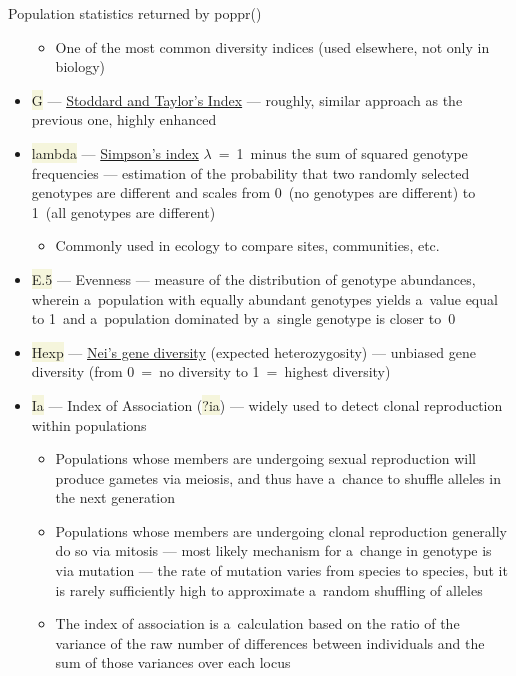 \documentclass[compress, xelatex, 11pt, xcolor=svgnames, aspectratio=169,
	hyperref={
		bookmarks=true,
		unicode=true,
		colorlinks=true,
		pdftitle={Molecular data in R},
		plainpages=false,
		pdfauthor={Vojtech Zeisek},
		pdfsubject={Course about phylogeny and evolution in R},
		pdfcreator={XeLaTeX},
		pdfkeywords={R, evolution, phylogeny, molecular data},
		linkcolor=Crimson, %
		anchorcolor=Magenta, %
		citecolor=Magenta, %
		filecolor=Magenta, %
		menucolor=Magenta, %
		urlcolor=DodgerBlue, %
		},
	url={hyphens, lowtilde} %
	]{beamer}
\renewcommand{\texttt}[1]{\colorbox{Beige}{{\ttfamily #1}}}
\begin{document}
\begin{frame}[allowframebreaks]{Population statistics returned by poppr()}
\begin{itemize}
		\begin{itemize}
			\item One of the most common diversity indices (used elsewhere, not only in biology)
		\end{itemize}
		\item \texttt{G} --- \href{https://academic.oup.com/genetics/article/118/4/705/5997522}{Stoddard and Taylor's Index} --- roughly, similar approach as the previous one, highly enhanced
		\item \texttt{lambda} --- \href{https://en.wikipedia.org/wiki/Diversity_index\#Simpson_index}{Simpson's index} $\lambda$~=~1~minus the sum of squared genotype frequencies --- estimation of the probability that two randomly selected genotypes are different and scales from 0~(no genotypes are different) to 1~(all genotypes are different)
		\begin{itemize}
			\item Commonly used in ecology to compare sites, communities, etc.
		\end{itemize}
		\item \texttt{E.5} --- Evenness --- measure of the distribution of genotype abundances, wherein a~population with equally abundant genotypes yields a~value equal to 1~and a~population dominated by a~single genotype is closer to~0
		\item \texttt{Hexp} --- \href{https://academic.oup.com/genetics/article/89/3/583/5992737}{Nei's gene diversity} (expected heterozygosity) --- unbiased gene diversity (from 0~=~no diversity to 1~=~highest diversity)
		\item \texttt{Ia} --- Index of Association (\texttt{?ia}) --- widely used to detect clonal reproduction within populations
		\begin{itemize}
			\item Populations whose members are undergoing sexual reproduction will produce gametes via meiosis, and thus have a~chance to shuffle alleles in the next generation
			\item Populations whose members are undergoing clonal reproduction generally do so via mitosis --- most likely mechanism for a~change in genotype is via mutation --- the rate of mutation varies from species to species, but it is rarely sufficiently high to approximate a~random shuffling of alleles
			\item The index of association is a~calculation based on the ratio of the variance of the raw number of differences between individuals and the sum of those variances over each locus

\end{itemize}
\end{itemize}
\end{frame}
\end{document}

